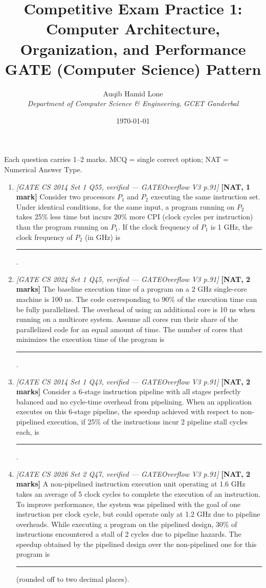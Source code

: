 \documentclass[11pt]{article}
\title{Competitive Exam Practice 1: Computer Architecture, Organization, and Performance\\\large GATE (Computer Science) Pattern}
\author{Auqib Hamid Lone\\[0.3em]
  \emph{Department of Computer Science \& Engineering}, \emph{GCET Ganderbal}}
\date{\today}
\begin{document}
\maketitle

\noindent Each question carries 1--2 marks. MCQ = single correct option; NAT = Numerical Answer Type.

\begin{enumerate}
\item[\textbf{Q1}] \textit{[GATE CS 2014 Set 1 Q55, verified --- GATEOverflow V3 p.91]} \textbf{[NAT, 1 mark]} Consider two processors $P_1$ and $P_2$ executing the same instruction set. Under identical conditions, for the same input, a program running on $P_2$ takes 25\% less time but incurs 20\% more CPI (clock cycles per instruction) than the program running on $P_1$. If the clock frequency of $P_1$ is 1 GHz, the clock frequency of $P_2$ (in GHz) is \rule{1.5cm}{0.4pt}.

\item[\textbf{Q2}] \textit{[GATE CS 2024 Set 1 Q45, verified --- GATEOverflow V3 p.91]} \textbf{[NAT, 2 marks]} The baseline execution time of a program on a 2 GHz single-core machine is 100 ns. The code corresponding to 90\% of the execution time can be fully parallelized. The overhead of using an additional core is 10 ns when running on a multicore system. Assume all cores run their share of the parallelized code for an equal amount of time. The number of cores that minimizes the execution time of the program is \rule{1.5cm}{0.4pt}.

\item[\textbf{Q3}] \textit{[GATE CS 2014 Set 1 Q43, verified --- GATEOverflow V3 p.91]} \textbf{[NAT, 2 marks]} Consider a 6-stage instruction pipeline with all stages perfectly balanced and no cycle-time overhead from pipelining. When an application executes on this 6-stage pipeline, the speedup achieved with respect to non-pipelined execution, if 25\% of the instructions incur 2 pipeline stall cycles each, is \rule{1.5cm}{0.4pt}.

\item[\textbf{Q4}] \textit{[GATE CS 2026 Set 2 Q47, verified --- GATEOverflow V3 p.91]} \textbf{[NAT, 2 marks]} A non-pipelined instruction execution unit operating at 1.6 GHz takes an average of 5 clock cycles to complete the execution of an instruction. To improve performance, the system was pipelined with the goal of one instruction per clock cycle, but could operate only at 1.2 GHz due to pipeline overheads. While executing a program on the pipelined design, 30\% of instructions encountered a stall of 2 cycles due to pipeline hazards. The speedup obtained by the pipelined design over the non-pipelined one for this program is \rule{1.5cm}{0.4pt} (rounded off to two decimal places).


\end{enumerate}
\end{document}
